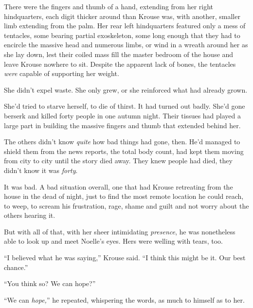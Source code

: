 There were the fingers and thumb of a hand, extending from her right hindquarters, each digit thicker around than Krouse was, with another, smaller limb extending from the palm.  Her rear left hindquarters featured only a mess of tentacles, some bearing partial exoskeleton, some long enough that they had to encircle the massive head and numerous limbs, or wind in a wreath around her as she lay down, lest their coiled mass fill the master bedroom of the house and leave Krouse nowhere to sit.  Despite the apparent lack of bones, the tentacles \emph{were }capable of supporting her weight.



She didn't expel waste.  She only grew, or she reinforced what had already grown.



She'd tried to starve herself, to die of thirst.  It had turned out badly.  She'd gone berserk and killed forty people in one autumn night.  Their tissues had played a large part in building the massive fingers and thumb that extended behind her.



The others didn't know \emph{quite} how bad things had gone, then.  He'd managed to shield them from the news reports, the total body count, had kept them moving from city to city until the story died away.  They knew people had died, they didn't know it was \emph{forty}.



It was bad.  A bad situation overall, one that had Krouse retreating from the house in the dead of night, just to find the most remote location he could reach, to weep, to scream his frustration, rage, shame and guilt and not worry about the others hearing it.



But with all of that, with her sheer intimidating \emph{presence}, he was nonetheless able to look up and meet Noelle's eyes.  Hers were welling with tears, too.



``I believed what he was saying,'' Krouse said.  ``I think this might be it.  Our best chance.''



``You think so?  We can hope?''



``We can \emph{hope,}'' he repeated, whispering the words, as much to himself as to her.



\blacksquare



